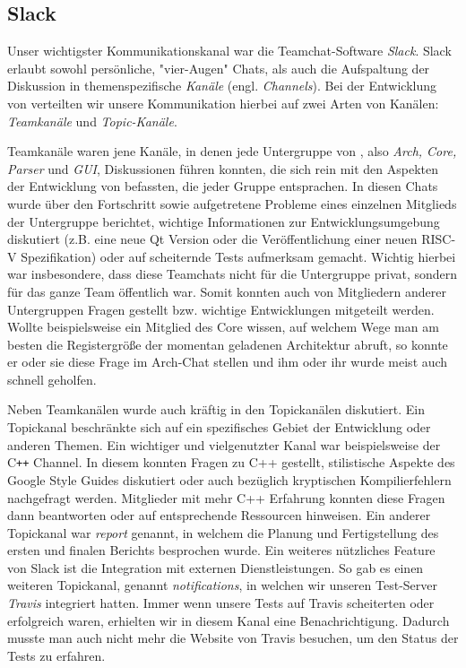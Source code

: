 
\subsection{Slack}
\label{team:group-slack}

Unser wichtigster Kommunikationskanal war die Teamchat-Software \emph{Slack}.
Slack erlaubt sowohl persönliche, "vier-Augen" Chats, als auch die Aufspaltung
der Diskussion in themenspezifische \emph{Kanäle} (engl. \emph{Channels}). Bei
der Entwicklung von \erasim{} verteilten wir unsere Kommunikation hierbei auf
zwei Arten von Kanälen: \emph{Teamkanäle} und \emph{Topic-Kanäle}.

Teamkanäle waren jene Kanäle, in denen jede Untergruppe von \erasim{}, also
\emph{Arch, Core, Parser} und \emph{GUI}, Diskussionen führen konnten, die sich
rein mit den Aspekten der Entwicklung von \erasim{} befassten, die jeder Gruppe
entsprachen. In diesen Chats wurde über den Fortschritt sowie aufgetretene
Probleme eines einzelnen Mitglieds der Untergruppe berichtet, wichtige
Informationen zur Entwicklungsumgebung diskutiert (z.B. eine neue Qt Version
oder die Veröffentlichung einer neuen RISC-V Spezifikation) oder auf scheiternde
Tests aufmerksam gemacht. Wichtig hierbei war insbesondere, dass diese Teamchats
nicht für die Untergruppe privat, sondern für das ganze \erasim{} Team
öffentlich war. Somit konnten auch von Mitgliedern anderer Untergruppen Fragen
gestellt bzw. wichtige Entwicklungen mitgeteilt werden. Wollte beispielsweise
ein Mitglied des Core wissen, auf welchem Wege man am besten die Registergröße der
momentan geladenen Architektur abruft, so konnte er oder sie diese Frage im
Arch-Chat stellen und ihm oder ihr wurde meist auch schnell geholfen.

Neben Teamkanälen wurde auch kräftig in den Topickanälen diskutiert. Ein
Topickanal beschränkte sich auf ein spezifisches Gebiet der Entwicklung oder
anderen Themen. Ein wichtiger und vielgenutzter Kanal war beispielsweise der
C\texttt{++} Channel. In diesem konnten Fragen zu C++ gestellt, stilistische
Aspekte des Google Style Guides diskutiert oder auch bezüglich kryptischen
Kompilierfehlern nachgefragt werden. Mitglieder mit mehr C++ Erfahrung konnten
diese Fragen dann beantworten oder auf entsprechende Ressourcen hinweisen. Ein
anderer Topickanal war \emph{report} genannt, in welchem die Planung und
Fertigstellung des ersten und finalen Berichts besprochen wurde. Ein weiteres
nützliches Feature von Slack ist die Integration mit externen Dienstleistungen.
So gab es einen weiteren Topickanal, genannt \emph{notifications}, in welchen
wir unseren Test-Server \emph{Travis} integriert hatten. Immer wenn unsere Tests
auf Travis scheiterten oder erfolgreich waren, erhielten wir in diesem Kanal
eine Benachrichtigung. Dadurch musste man auch nicht mehr die Website von Travis
besuchen, um den Status der Tests zu erfahren.

